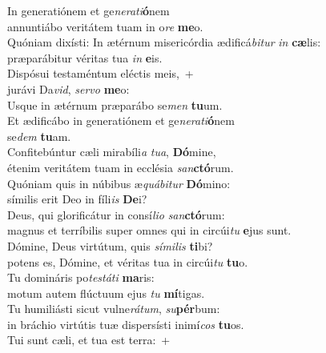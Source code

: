 \evenverse In generatiónem et ge\textit{ne}\textit{ra}\textit{ti}\textbf{ó}nem~\*\\
\evenverse annuntiábo veritátem tuam in o\textit{re} \textbf{me}o.\\
\oddverse Quóniam dixísti: In ætérnum misericórdia ædificá\textit{bi}\textit{tur} \textit{in} \textbf{cæ}lis:~\*\\
\oddverse præparábitur véritas tua \textit{in} \textbf{e}is.\\
\evenverse Dispósui testaméntum eléctis meis,~+\\
\evenverse  jurávi Da\textit{vid}, \textit{ser}\textit{vo} \textbf{me}o:~\*\\
\evenverse Usque in ætérnum præparábo se\textit{men} \textbf{tu}um.\\
\oddverse Et ædificábo in generatiónem et ge\textit{ne}\textit{ra}\textit{ti}\textbf{ó}nem~\*\\
\oddverse se\textit{dem} \textbf{tu}am.\\
\evenverse Confitebúntur cæli mirabíli\textit{a} \textit{tu}\textit{a}, \textbf{Dó}mine,~\*\\
\evenverse étenim veritátem tuam in ecclésia \textit{san}\textbf{ctó}rum.\\
\oddverse Quóniam quis in núbibus æ\textit{quá}\textit{bi}\textit{tur} \textbf{Dó}mino:~\*\\
\oddverse símilis erit Deo in fíli\textit{is} \textbf{De}i?\\
\evenverse Deus, qui glorificátur in consí\textit{li}\textit{o} \textit{san}\textbf{ctó}rum:~\*\\
\evenverse magnus et terríbilis super omnes qui in circúi\textit{tu} \textbf{e}jus sunt.\\
\oddverse Dómine, Deus virtútum, quis \textit{sí}\textit{mi}\textit{lis} \textbf{ti}bi?~\*\\
\oddverse potens es, Dómine, et véritas tua in circúi\textit{tu} \textbf{tu}o.\\
\evenverse Tu domináris po\textit{te}\textit{stá}\textit{ti} \textbf{ma}ris:~\*\\
\evenverse motum autem flúctuum ejus \textit{tu} \textbf{mí}tigas.\\
\oddverse Tu humiliásti sicut vulne\textit{rá}\textit{tum}, \textit{su}\textbf{pér}bum:~\*\\
\oddverse in bráchio virtútis tuæ dispersísti inimí\textit{cos} \textbf{tu}os.\\
\evenverse Tui sunt cæli, et tua est terra:~+\\
